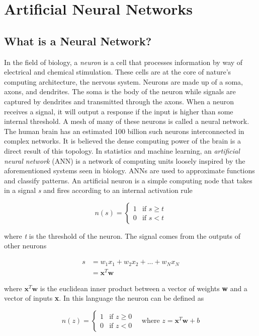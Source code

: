 \chapter{Artificial Neural Networks}
\section{What is a Neural Network?}
\label{sec: nn_intro}

In the field of biology, a \textit{neuron} is a cell that processes information by way of electrical and chemical stimulation. These cells are at the core of nature's computing architecture, the nervous system. Neurons are made up of a soma, axons, and dendrites. The soma is the body of the neuron while signals are captured by dendrites and transmitted through the axons. When a neuron receives a signal, it will output a response if the input is higher than some internal threshold. A mesh of many of these neurons is called a neural network. The human brain has an estimated 100 billion such neurons interconnected in complex networks. It is believed the dense computing power of the brain is a direct result of this topology. In statistics and machine learning, an \textit{artificial neural network} (ANN) is a network of computing units loosely inspired by the aforementioned systems seen in biology. ANNs are used to approximate functions and classify patterns. An artificial neuron is a simple computing node that takes in a signal \textit{s} and fires according to an internal activation rule

\begin{equation*}
n(s) = \begin{cases} 1 &\mbox{if } s \geq t \\ 
0&\mbox{if } s < t \end{cases}
\end{equation*}

\noindent where \textit{t} is the threshold of the neuron. The signal comes from the outputs of other neurons

\begin{align*}
s & = w_1x_1 + w_2x_2 + ... + w_Nx_N \\
& = \textbf{x}^T\textbf{w}
\end{align*}

\noindent where $\textbf{x}^T\textbf{w}$ is the euclidean inner product between a vector of weights \textbf{w} and a vector of inputs \textbf{x}. In this language the neuron can be defined as

\begin{equation}
n(z) = \begin{cases} 1 &\mbox{if } z \geq 0 \\ 
0&\mbox{if } z < 0 \end{cases} \quad \mbox{where } z = \textbf{x}^T\textbf{w} + b
\end{equation}

